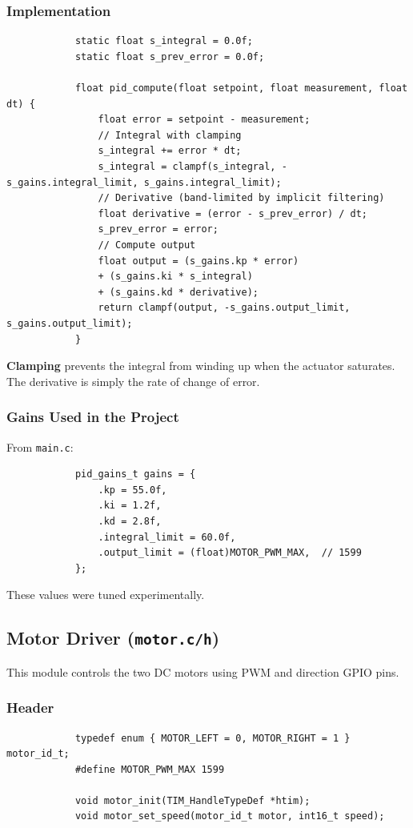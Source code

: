 \documentclass[12pt,a4paper]{article}
\begin{document}
		\subsubsection{Implementation}
		\begin{lstlisting}
			static float s_integral = 0.0f;
			static float s_prev_error = 0.0f;
			
			float pid_compute(float setpoint, float measurement, float dt) {
				float error = setpoint - measurement;
				// Integral with clamping
				s_integral += error * dt;
				s_integral = clampf(s_integral, -s_gains.integral_limit, s_gains.integral_limit);
				// Derivative (band‑limited by implicit filtering)
				float derivative = (error - s_prev_error) / dt;
				s_prev_error = error;
				// Compute output
				float output = (s_gains.kp * error) 
				+ (s_gains.ki * s_integral) 
				+ (s_gains.kd * derivative);
				return clampf(output, -s_gains.output_limit, s_gains.output_limit);
			}
		\end{lstlisting}
		\textbf{Clamping} prevents the integral from winding up when the actuator saturates. The derivative is simply the rate of change of error.
		
		\subsubsection{Gains Used in the Project}
		From \texttt{main.c}:
		\begin{lstlisting}
			pid_gains_t gains = {
				.kp = 55.0f,
				.ki = 1.2f,
				.kd = 2.8f,
				.integral_limit = 60.0f,
				.output_limit = (float)MOTOR_PWM_MAX,  // 1599
			};
		\end{lstlisting}
		These values were tuned experimentally.
		
		\subsection{Motor Driver (\texttt{motor.c/h})}
		This module controls the two DC motors using PWM and direction GPIO pins.
		
		\subsubsection{Header}
		\begin{lstlisting}
			typedef enum { MOTOR_LEFT = 0, MOTOR_RIGHT = 1 } motor_id_t;
			#define MOTOR_PWM_MAX 1599
			
			void motor_init(TIM_HandleTypeDef *htim);
			void motor_set_speed(motor_id_t motor, int16_t speed);
		\end{lstlisting}
		
\end{document}
